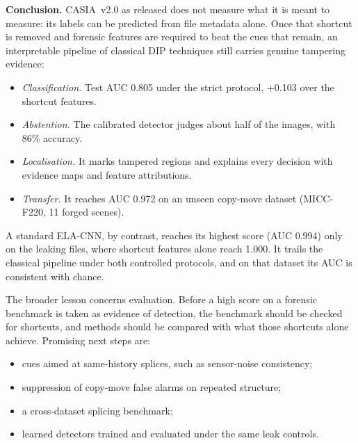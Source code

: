 \textbf{Conclusion.} CASIA~v2.0 as released does not measure what it is meant to measure: its labels can be
predicted from file metadata alone. Once that shortcut is removed and forensic features are required to beat the
cues that remain, an interpretable pipeline of classical DIP techniques still carries genuine tampering evidence:
\begin{itemize}\setlength\itemsep{0pt}
\item \emph{Classification.} Test AUC 0.805 under the strict protocol, +0.103 over the shortcut features.
\item \emph{Abstention.} The calibrated detector judges about half of the images, with 86\% accuracy.
\item \emph{Localisation.} It marks tampered regions and explains every decision with evidence maps and feature
attributions.
\item \emph{Transfer.} It reaches AUC 0.972 on an unseen copy-move dataset (MICC-F220, 11 forged scenes).
\end{itemize}
A standard ELA-CNN, by contrast, reaches its highest score (AUC 0.994) only on the leaking files, where shortcut
features alone reach 1.000. It trails the classical pipeline under both controlled protocols, and on that dataset
its AUC is consistent with chance.

The broader lesson concerns evaluation. Before a high score on a forensic benchmark is taken as evidence of
detection, the benchmark should be checked for shortcuts, and methods should be compared with what those shortcuts
alone achieve. Promising next steps are:
\begin{itemize}\setlength\itemsep{0pt}
\item cues aimed at same-history splices, such as sensor-noise consistency;
\item suppression of copy-move false alarms on repeated structure;
\item a cross-dataset splicing benchmark;
\item learned detectors trained and evaluated under the same leak controls.
\end{itemize}
